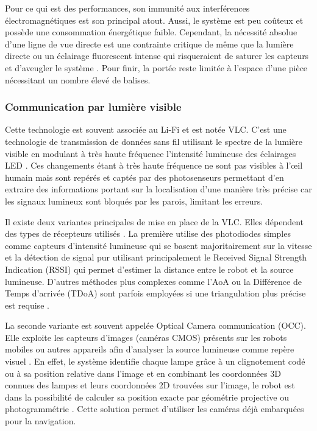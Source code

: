 \documentclass[11pt, a4paper]{article}
\begin{document}
Pour ce qui est des performances, son immunité aux interférences électromagnétiques est son principal atout. Aussi, le système est peu coûteux et possède une consommation énergétique faible. Cependant, la nécessité absolue d’une ligne de vue directe est une contrainte critique de même que la lumière directe ou un éclairage fluorescent intense qui risqueraient de saturer les capteurs et d’aveugler le système \cite{huangIndoorPositioningSystems2023}. Pour finir, la portée reste limitée à l’espace d’une pièce nécessitant un nombre élevé de balises.

\subsubsection{Communication par lumière visible}

Cette technologie est souvent associée au Li-Fi et est notée VLC. C’est une technologie de transmission de données sans fil utilisant le spectre de la lumière visible en modulant à très haute fréquence l’intensité lumineuse des éclairages LED  \cite{huangIndoorPositioningSystems2023}. Ces changements étant à très haute fréquence ne sont pas visibles à l’œil humain mais sont repérés et captés par des photosenseurs permettant d’en extraire des informations portant sur la localisation d’une manière très précise car les signaux lumineux sont bloqués par les parois, limitant les erreurs.

Il existe deux variantes principales de mise en place de la VLC. Elles dépendent des types de récepteurs utilisés \cite{sesyukSurvey3DIndoor2022}. La première utilise des photodiodes simples comme capteurs d’intensité lumineuse qui se basent majoritairement sur la vitesse et la détection de signal pur utilisant principalement le  Received Signal Strength Indication (RSSI) qui permet d’estimer la distance entre le robot et la source lumineuse. D’autres méthodes plus complexes comme l’AoA ou la Différence de Temps d’arrivée (TDoA) sont parfois employées si une triangulation plus précise est requise \cite{obeidatReviewIndoorLocalization2021}.

La seconde variante est souvent appelée Optical Camera communication (OCC). Elle exploite les capteurs d’images (caméras CMOS) présents sur les robots mobiles ou autres appareils afin d’analyser la source lumineuse comme repère visuel \cite{sesyukSurvey3DIndoor2022}. En effet, le système identifie chaque lampe grâce à un clignotement codé ou à sa position relative dans l’image et en combinant les coordonnées 3D connues des lampes et leurs coordonnées 2D trouvées sur l’image, le robot est dans la possibilité de calculer sa position exacte par géométrie projective ou photogrammétrie \cite{huangIndoorPositioningSystems2023}. Cette solution permet d’utiliser les caméras déjà embarquées pour la navigation.
\end{document}
